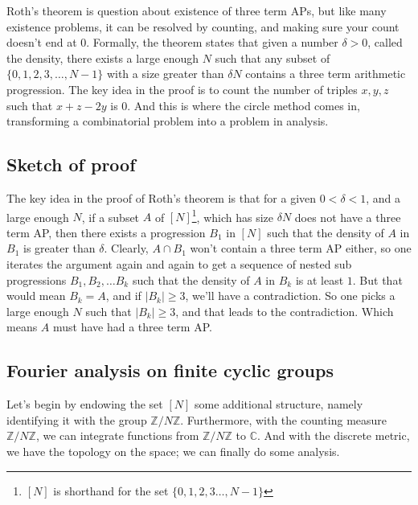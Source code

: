 \documentclass[12pt, titlepage]{article}
\theoremstyle{definition}
\newcommand{\znz}{\mathbb{Z}/N\mathbb{Z}}
\begin{document}
Roth's theorem is question about existence of three term APs, but like many existence problems, it can be resolved by counting, and making sure your count doesn't end at $0$. Formally, the theorem states that given a number $\delta > 0$, called the density, there exists a large enough $N$ such that any subset of $\{0,1, 2, 3, \ldots, N-1\}$ with a size greater than $\delta N$ contains a  three term arithmetic progression.  The key idea in the proof is to count the number of triples $x,y,z$ such that $x+z-2y$ is $0$. And this is where the circle method comes in, transforming a combinatorial problem into a problem in analysis.

\subsection{Sketch of proof}
The key idea in the proof of Roth's theorem is that for a given $0 < \delta < 1$, and a large enough $N$, if a subset $A$ of $[N]$\footnote{$[N]$ is shorthand for the set $\{0,1, 2,3 \ldots, N-1\}$}, which has size $\delta N$ does not have a three term AP, then there exists a progression $B_1$ in $[N]$ such that the density of $A$ in $B_1$ is greater than $\delta$. Clearly, $A \cap B_1$ won't contain a three term AP either, so one iterates the argument again and again to get a sequence of nested sub progressions $B_1, B_2, \ldots B_k$ such that the density of $A$ in $B_k$ is at least $1$. But that would mean $B_k = A$, and if $|B_k| \geq 3$, we'll have a contradiction. So one picks a large enough $N$ such that $|B_k| \geq 3$, and that leads to the contradiction. Which means $A$ must have had a three term AP.

\subsection{Fourier analysis on finite cyclic groups}
Let's begin by endowing the set $[N]$ some additional structure, namely identifying it with the group $\znz$. Furthermore, with the counting measure $\znz$, we can integrate functions from $\znz$ to $\mathbb{C}$. And with the discrete metric, we have the topology on the space; we can finally do some analysis.
\end{document}
